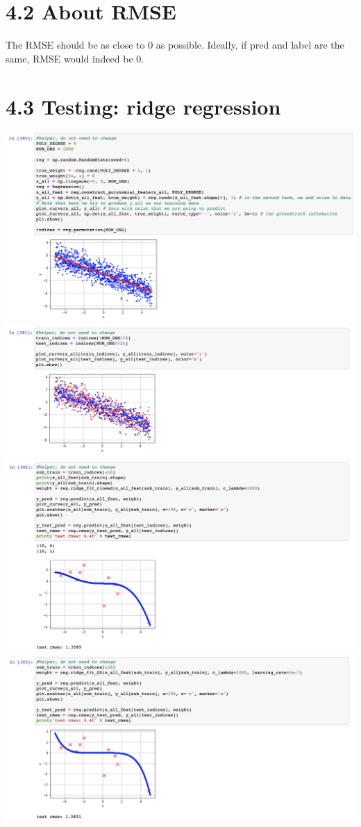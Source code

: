 \documentclass{article}
\begin{document}
\section*{4.2 About RMSE}
The RMSE should be as close to 0 as possible. Ideally, if pred and label are the same, RMSE would indeed be 0.

\section*{4.3 Testing: ridge regression}
\includegraphics*[scale=0.35]{img1.png}
\includegraphics*[scale=0.35]{img2.png}
\includegraphics*[scale=0.35]{img3.png}
\includegraphics*[scale=0.35]{img4.png}
\end{document}
